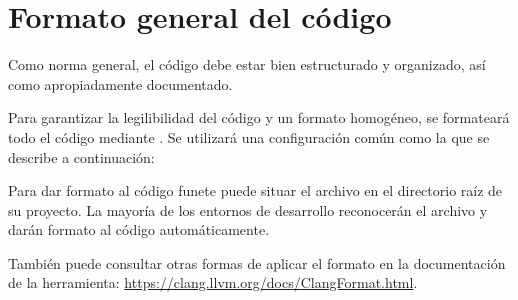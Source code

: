 \section{Formato general del código}

Como norma general, el código debe estar bien estructurado y organizado, así
como apropiadamente documentado.

Para garantizar la legilibilidad del código y un formato homogéneo, se
formateará todo el código mediante . Se utilizará una
configuración común como la que se describe a continuación:



Para dar formato al código funete puede situar el archivo
 en el directorio raíz de su proyecto. La mayoría de los
entornos de desarrollo reconocerán el archivo y darán formato al código
automáticamente.

También puede consultar otras formas de aplicar el formato en la documentación
de la herramienta:
\url{https://clang.llvm.org/docs/ClangFormat.html}.
